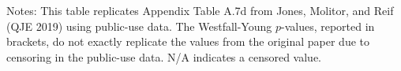 \documentclass{article}
\begin{document}
\begin{table}[tbp]
{\begin{tabularx}{\linewidth}{lCCCCC}
\end{tabularx}
\begin{flushleft}
\footnotesize Notes: This table replicates Appendix Table A.7d from Jones, Molitor, and Reif (QJE 2019) using public-use data. The Westfall-Young \(p\)-values, reported in brackets, do not exactly replicate the values from the original paper due to censoring in the public-use data. N/A indicates a censored value.
\end{flushleft}
}
\end{table}
\end{document}
